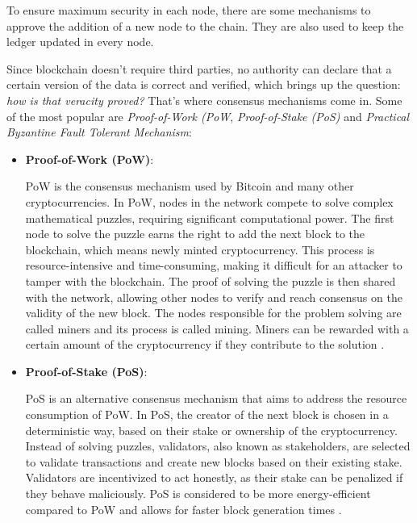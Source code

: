 To ensure maximum security in each node, there are some mechanisms to approve the addition of a new node to the chain. They are also used to keep the ledger updated in every node. \par
Since blockchain doesn't require third parties, no authority can declare that a certain version of the data is correct and verified, which brings up the question: \textit{how is that veracity proved?} \newline
That's where consensus mechanisms come in. Some of the most popular are \textit{Proof-of-Work (PoW}, \textit{Proof-of-Stake (PoS)} and \textit{Practical Byzantine Fault Tolerant Mechanism}:\newline

\begin{itemize}
    \item \textbf{Proof-of-Work (PoW)}:
    
    PoW is the consensus mechanism used by Bitcoin and many other cryptocurrencies. In PoW, nodes in the network compete to solve complex mathematical puzzles, requiring significant computational power. The first node to solve the puzzle earns the right to add the next block to the blockchain, which means newly minted cryptocurrency.\newline
    This process is resource-intensive and time-consuming, making it difficult for an attacker to tamper with the blockchain. The proof of solving the puzzle is then shared with the network, allowing other nodes to verify and reach consensus on the validity of the new block. The nodes responsible for the problem solving are called miners and its process is called mining. Miners can be rewarded with a certain amount of the cryptocurrency if they contribute to the solution \cite{hack}.

    \item \textbf{Proof-of-Stake (PoS)}: 
    
    PoS is an alternative consensus mechanism that aims to address the resource consumption of PoW. In PoS, the creator of the next block is chosen in a deterministic way, based on their stake or ownership of the cryptocurrency. Instead of solving puzzles, validators, also known as stakeholders, are selected to validate transactions and create new blocks based on their existing stake. Validators are incentivized to act honestly, as their stake can be penalized if they behave maliciously. PoS is considered to be more energy-efficient compared to PoW and allows for faster block generation times \cite{hack}.


\end{itemize}
